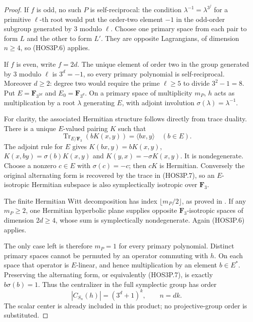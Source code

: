 \begin{proof}
If $f$ is odd, no such $P$ is self-reciprocal: the condition
$\lambda^{-1}=\lambda^{3^j}$ for a primitive $\ell$-th root
would put the order-two element $-1$ in the odd-order subgroup
generated by $3$ modulo $\ell$. Choose one primary space from
each pair to form $L$ and the other to form $L'$. They are
opposite Lagrangians, of dimension $n\ge4$, so (HOS3P.6) applies.

If $f$ is even, write $f=2d$. The unique element of order two
in the group generated by $3$ modulo $\ell$ is
$3^d=-1$, so every primary polynomial is self-reciprocal.
Moreover $d\ge2$: degree two would require the prime $\ell\ge5$
to divide $3^2-1=8$. Put $E=\mathbf F_{3^{2d}}$ and
$E_0=\mathbf F_{3^d}$. On a primary space of multiplicity $m_P$,
$h$ acts as multiplication by a root $\lambda$ generating $E$,
with adjoint involution $\sigma(\lambda)=\lambda^{-1}$.

For clarity, the associated Hermitian structure follows directly
from trace duality. There is a unique $E$-valued pairing $K$ such
that
\[
 \operatorname{Tr}_{E/\mathbf F_3}(bK(x,y))
                         =\langle bx,y\rangle\quad(b\in E).
                                                               \tag{HOS3P.7}
\]
The adjoint rule for $E$ gives
$K(bx,y)=bK(x,y)$, $K(x,by)=\sigma(b)K(x,y)$ and
$K(y,x)=-\sigma K(x,y)$. It is nondegenerate. Choose a nonzero
$c\in E$ with $\sigma(c)=-c$; then $cK$ is Hermitian.
Conversely the original alternating form is recovered by the
trace in (HOS3P.7), so an $E$-isotropic Hermitian subspace is
also symplectically isotropic over $\mathbf F_3$.

The finite Hermitian Witt decomposition has index
$\lfloor m_P/2\rfloor$, as proved in
\cite[Lemma~10.2, Corollary~10.3 and the following decomposition,
pp.~116--117]{HOS:Taylor1992}.
If any $m_P\ge2$, one Hermitian hyperbolic plane supplies
opposite $\mathbf F_3$-isotropic spaces of dimension
$2d\ge4$, whose sum is symplectically nondegenerate. Again
(HOS3P.6) applies.

The only case left is therefore $m_P=1$ for every primary
polynomial. Distinct primary spaces cannot be permuted by an
operator commuting with $h$. On each space that operator is
$E$-linear, and hence multiplication by an element $b\in E^*$.
Preserving the alternating form, or equivalently (HOS3P.7),
is exactly $b\sigma(b)=1$. Thus the centralizer in the full
symplectic group has order
\[
               |C_{S_n}(h)|=(3^d+1)^k,\qquad n=dk.          \tag{HOS3P.8}
\]
The scalar center is already included in this product; no
projective-group order is substituted.


\end{proof}
